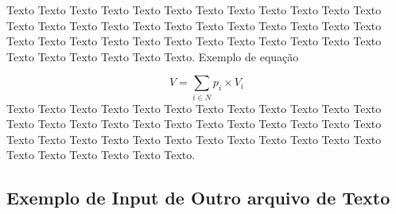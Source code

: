 \paragrafo{}
Texto Texto Texto Texto Texto Texto Texto Texto Texto Texto Texto Texto Texto Texto Texto Texto Texto Texto Texto Texto Texto Texto Texto Texto Texto Texto Texto Texto Texto Texto Texto Texto Texto Texto Texto Texto Texto Texto Texto Texto Texto Texto.
\paragrafo{}
Exemplo de equação

  \begin{equation}
  \label{eq:VExperado}
  V = \sum_{i\in{N}} p_{i}	\times V_{i}
  \end{equation}
\paragrafo{}
Texto Texto Texto Texto Texto Texto Texto Texto Texto Texto Texto Texto Texto Texto Texto Texto Texto Texto Texto Texto Texto Texto Texto Texto Texto Texto Texto Texto Texto Texto Texto Texto Texto Texto Texto Texto Texto Texto Texto Texto Texto Texto.
\subsection{Exemplo de Input de Outro arquivo de Texto}


 
